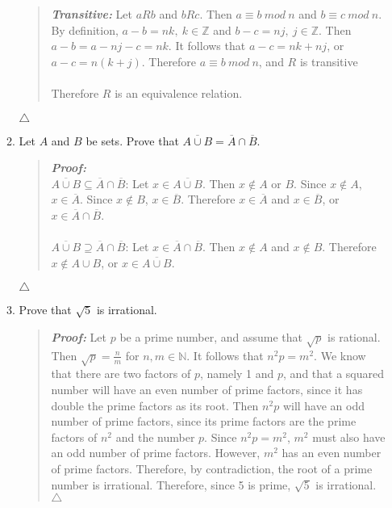 \documentclass{article}
\newcommand{\Proof}{\textit{\textbf{Proof: }}}
\newcommand{\NN}{\mathbb{N}}
\newcommand{\ZZ}{\mathbb{Z}}
\begin{document}
\begin{enumerate}
\begin{enumerate}
\begin{quote}
\textit{\textbf{Transitive:}} Let $aRb$ and $bRc$.
Then $a\equiv b\ mod\ n$ and $b\equiv c\ mod\ n$.
By definition, $a-b = nk,\ k\in\ZZ$ and $b - c = nj,\ j\in\ZZ$.
Then $a-b = a-nj-c = nk$.
It follows that $a-c = nk + nj$, or $a-c = n(k + j)$.
Therefore $a\equiv b\ mod\ n$, and $R$ is transitive\\\\
Therefore $R$ is an equivalence relation.
\end{quote}
$\triangle$
\item Let $A$ and $B$ be sets.
Prove that $\overline{A \cup B} = \overline{A} \cap \overline{B}$.
\begin{quote}
\Proof\\ 
{$\overline{A \cup B} \subseteq \overline{A} \cap \overline{B}$:} 
Let $x\in\overline{A \cup B}$.
Then $x \notin A$ or $B$.
Since $x \notin A$, $x \in \overline{A}$.
Since $x \notin B$, $x \in \overline{B}$.
Therefore $x \in \overline{A}$ and $x\in\overline{B}$, or $x \in \overline{A} \cap \overline{B}$.\\\\
{$\overline{A \cup B} \supseteq \overline{A} \cap \overline{B}$:} 
Let $x\in\overline{A} \cap \overline{B}$.
Then $x \notin A$ and $x \notin B$.
Therefore $x \notin A \cup B$, or $x \in \overline{A \cup B}$.
\end{quote}
$\triangle$
\item Prove that $\sqrt{5}$ is irrational.
\begin{quote}
\Proof Let $p$ be a prime number, and assume that $\sqrt{p}$ is rational.
Then $\sqrt{p} = \frac{n}{m}$ for $n,m \in \NN$.
It follows that $n^{2} p = m^{2}$.
We know that there are two factors of $p$, namely 1 and $p$, and that a squared number will have an even number of prime factors, since it has double the prime factors as its root.
Then $n^{2}p$ will have an odd number of prime factors, since its prime factors are the prime factors of $n^{2}$ and the number $p$.
Since $n^{2}p = m^{2}$, $m^{2}$ must also have an odd number of prime factors.
However, $m^{2}$ has an even number of prime factors.
Therefore, by contradiction, the root of a prime number is irrational.
Therefore, since 5 is prime, $\sqrt{5}$ is irrational. $\triangle$
\end{quote}
\end{enumerate}
\end{enumerate}
\end{document}
